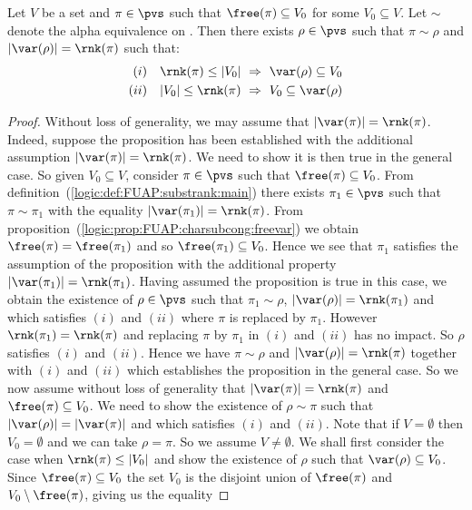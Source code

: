 \begin{prop}\label{logic:prop:FUAP:substrank:changeofvar}
Let $V$ be a set and $\pi\in\pvs$ such that $\free(\pi)\subseteq
V_{0}$ for some $V_{0}\subseteq V$.  Let $\sim$ denote the
alpha equivalence on \pvs. Then there exists $\rho\in\pvs$
such that $\pi\sim\rho$ and $|\var(\rho)|=\rnk(\pi)$ such that:
    \begin{eqnarray*}
    (i)&&\rnk(\pi)\leq|V_{0}|\ \Rightarrow\ \var(\rho)\subseteq
    V_{0}\\
    (ii)&&|V_{0}|\leq\rnk(\pi)\ \Rightarrow\
    V_{0}\subseteq\var(\rho)
    \end{eqnarray*}
\end{prop}
\begin{proof}
Without loss of generality, we may assume that
$|\var(\pi)|=\rnk(\pi)$. Indeed, suppose the proposition has been
established with the additional assumption $|\var(\pi)|=\rnk(\pi)$.
We need to show it is then true in the general case. So given
$V_{0}\subseteq V$, consider $\pi\in\pvs$ such that
$\free(\pi)\subseteq V_{0}$. From
definition~(\ref{logic:def:FUAP:substrank:main}) there exists
$\pi_{1}\in\pvs$ such that $\pi\sim\pi_{1}$ with the equality
$|\var(\pi_{1})|=\rnk(\pi)$. From
proposition~(\ref{logic:prop:FUAP:charsubcong:freevar}) we obtain
$\free(\pi)=\free(\pi_{1})$ and so $\free(\pi_{1})\subseteq V_{0}$.
Hence we see that $\pi_{1}$ satisfies the assumption of the
proposition with the additional property
$|\var(\pi_{1})|=\rnk(\pi_{1})$. Having assumed the proposition is
true in this case, we obtain the existence of $\rho\in\pvs$ such
that $\pi_{1}\sim\rho$, $|\var(\rho)|=\rnk(\pi_{1})$ and which
satisfies $(i)$ and $(ii)$ where $\pi$ is replaced by $\pi_{1}$.
However $\rnk(\pi_{1})=\rnk(\pi)$ and replacing $\pi$ by $\pi_{1}$
in $(i)$ and $(ii)$ has no impact. So $\rho$ satisfies $(i)$ and
$(ii)$. Hence we have $\pi\sim\rho$ and $|\var(\rho)|=\rnk(\pi)$
together with $(i)$ and $(ii)$ which establishes the proposition in
the general case. So we now assume without loss of generality that
$|\var(\pi)|=\rnk(\pi)$ and $\free(\pi)\subseteq V_{0}$. We need to
show the existence of $\rho\sim\pi$ such that
$|\var(\rho)|=|\var(\pi)|$ and which satisfies $(i)$ and $(ii)$.
Note that if $V=\emptyset$  then $V_{0}=\emptyset$ and we can take
$\rho=\pi$. So we assume $V\neq\emptyset$. We shall first consider
the case when $\rnk(\pi)\leq |V_{0}|$ and show the existence of
$\rho$ such that $\var(\rho)\subseteq V_{0}$. Since
$\free(\pi)\subseteq V_{0}$ the set $V_{0}$ is the disjoint union of
$\free(\pi)$ and $V_{0}\setminus\free(\pi)$, giving us the equality

\end{proof}
